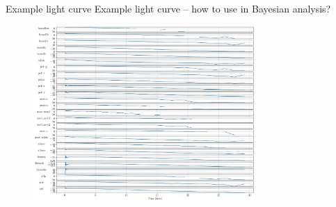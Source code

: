 \documentclass[usenames,dvipsnames,t]{beamer}
\begin{document}
\begin{frame}{Example light curve}
    Example light curve -- how to use in Bayesian analysis?
    \begin{figure}
      \centering
      \includegraphics[width=0.75\textwidth]{Figures/example_bulla_LC.png}
    \end{figure}
\end{frame}
\end{document}
